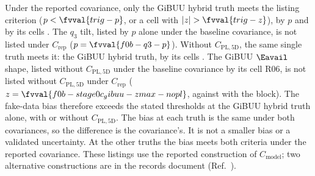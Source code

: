 Under the reported covariance, only the GiBUU hybrid truth meets the listing criterion ($p<\fvval{trig-p}$, or a cell with $|z|>\fvval{trig-z}$), by $p$ and by its cells . The $q_3$ tilt, listed by $p$ alone under the baseline covariance, is not listed under $C_{\mathrm{rep}}$ ($p=\fvval{f0b-q3-p}$). Without $C_{\mathrm{PL,5D}}$, the same single truth meets it: the GiBUU hybrid truth, by its cells . The GiBUU $\Eavail$ shape, listed without $C_{\mathrm{PL,5D}}$ under the baseline covariance by its cell R06, is not listed without $C_{\mathrm{PL,5D}}$ under $C_{\mathrm{rep}}$ ($z=\fvval{f0b-stage0c_gibuu-zmax-nopl}$, against  with the block). The fake-data bias therefore exceeds the stated thresholds at the GiBUU hybrid truth alone, with or without $C_{\mathrm{PL,5D}}$. The bias at each truth is the same under both covariances, so the difference is the covariance's. It is not a smaller bias or a validated uncertainty. At the other  truths the bias meets both criteria under the reported covariance. These listings use the reported construction of $C_{\mathrm{model}}$; two alternative constructions are in the records document (Ref.~\cite{NoteRecords2026}).


